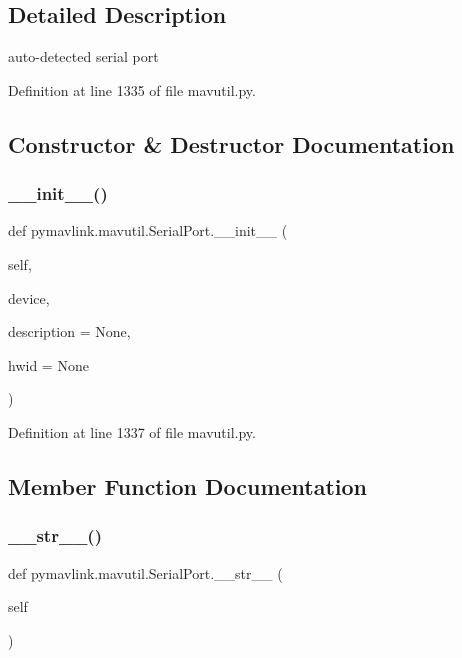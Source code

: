 \subsection{Detailed Description}
\begin{DoxyVerb}auto-detected serial port\end{DoxyVerb}
 

Definition at line 1335 of file mavutil.\+py.



\subsection{Constructor \& Destructor Documentation}
\mbox{\label{classpymavlink_1_1mavutil_1_1SerialPort_a1fc475b038be7d01e9bbd3f8b4d8c573}} 
\subsubsection{\texorpdfstring{\_\_init\_\_()}{\_\_init\_\_()}}
{\footnotesize\ttfamily def pymavlink.\+mavutil.\+Serial\+Port.\+\_\+\+\_\+init\+\_\+\+\_\+ (\begin{DoxyParamCaption}\item[{}]{self,  }\item[{}]{device,  }\item[{}]{description = {\ttfamily None},  }\item[{}]{hwid = {\ttfamily None} }\end{DoxyParamCaption})}



Definition at line 1337 of file mavutil.\+py.



\subsection{Member Function Documentation}
\mbox{\label{classpymavlink_1_1mavutil_1_1SerialPort_a577fb69c14065d576592d2e15977366a}} 
\subsubsection{\texorpdfstring{\_\_str\_\_()}{\_\_str\_\_()}}
{\footnotesize\ttfamily def pymavlink.\+mavutil.\+Serial\+Port.\+\_\+\+\_\+str\+\_\+\+\_\+ (\begin{DoxyParamCaption}\item[{}]{self }\end{DoxyParamCaption})}



